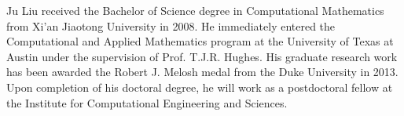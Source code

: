 \documentclass[12pt]{report} %
\begin{document}



\begin{vita}
Ju Liu received the Bachelor of Science degree in Computational Mathematics from Xi'an Jiaotong University in 2008. He immediately entered the Computational and Applied Mathematics program at the University of Texas at Austin under the supervision of Prof. T.J.R. Hughes. His graduate research work has been awarded the Robert J. Melosh medal from the Duke University in 2013. Upon completion of his doctoral degree, he will work as a postdoctoral fellow at the Institute for Computational Engineering and Sciences.

\end{vita}
\end{document}

